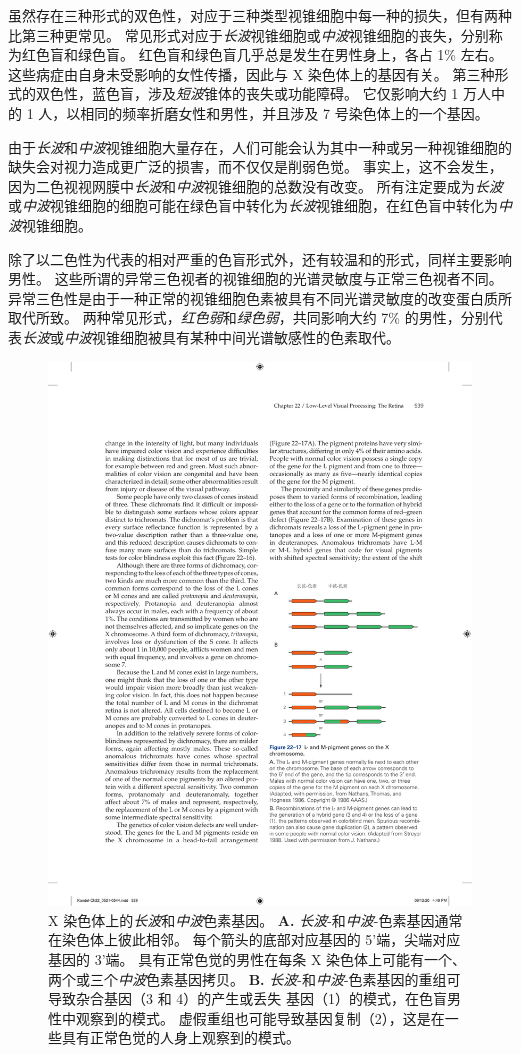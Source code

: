 虽然存在三种形式的双色性，对应于三种类型视锥细胞中每一种的损失，但有两种比第三种更常见。
常见形式对应于\textit{长波}视锥细胞或\textit{中波}视锥细胞的丧失，分别称为红色盲和绿色盲。
红色盲和绿色盲几乎总是发生在男性身上，各占 1\% 左右。
这些病症由自身未受影响的女性传播，因此与 X 染色体上的基因有关。
第三种形式的双色性，蓝色盲，涉及\textit{短波}锥体的丧失或功能障碍。
它仅影响大约 1 万人中的 1 人，以相同的频率折磨女性和男性，并且涉及 7 号染色体上的一个基因。


由于\textit{长波}和\textit{中波}视锥细胞大量存在，人们可能会认为其中一种或另一种视锥细胞的缺失会对视力造成更广泛的损害，而不仅仅是削弱色觉。
事实上，这不会发生，因为二色视视网膜中\textit{长波}和\textit{中波}视锥细胞的总数没有改变。
所有注定要成为\textit{长波}或\textit{中波}视锥细胞的细胞可能在绿色盲中转化为\textit{长波}视锥细胞，在红色盲中转化为\textit{中波}视锥细胞。


除了以二色性为代表的相对严重的色盲形式外，还有较温和的形式，同样主要影响男性。
这些所谓的异常三色视者的视锥细胞的光谱灵敏度与正常三色视者不同。
异常三色性是由于一种正常的视锥细胞色素被具有不同光谱灵敏度的改变蛋白质所取代所致。
两种常见形式，\textit{红色弱}和\textit{绿色弱}，共同影响大约 7\% 的男性，分别代表\textit{长波}或\textit{中波}视锥细胞被具有某种中间光谱敏感性的色素取代。


\begin{figure}[htbp]
	\centering
	\includegraphics[width=0.5\linewidth]{chap22/fig_22_17}
	\caption{X 染色体上的\textit{长波}和\textit{中波}色素基因。 
		\textbf{A.} \textit{长波}-和\textit{中波}-色素基因通常在染色体上彼此相邻。
		每个箭头的底部对应基因的 5'端，尖端对应基因的 3'端。 
		具有正常色觉的男性在每条 X 染色体上可能有一个、两个或三个\textit{中波}色素基因拷贝\cite{nathans1986molecular}。
		\textbf{B.} \textit{长波}-和\textit{中波}-色素基因的重组可导致杂合基因（3 和 4）的产生或丢失 基因（1）的模式，在色盲男性中观察到的模式。 
		虚假重组也可能导致基因复制（2），这是在一些具有正常色觉的人身上观察到的模式。}
	\label{fig:22_17}
\end{figure}


